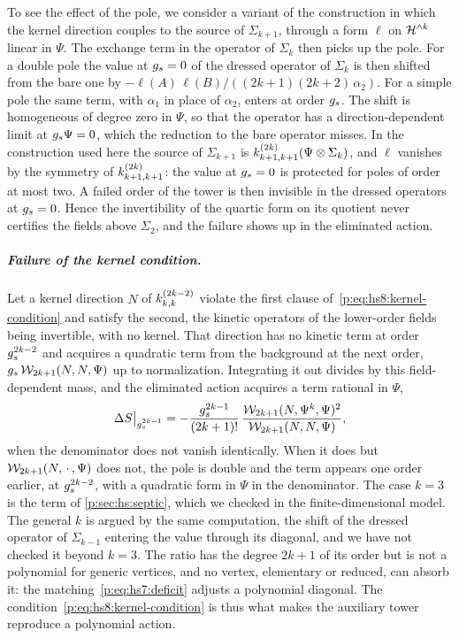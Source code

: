 To see the effect of the pole, we consider a variant of the construction in which the kernel direction couples to the source of $\Sigma_{k + 1}$, through a form $\ell$ on $\mathcal{H}^{\wedge k}$ linear in $\Psi$.
The exchange term in the operator of $\Sigma_k$ then picks up the pole.
For a double pole the value at $g_s = 0$ of the dressed operator of $\Sigma_k$ is then shifted from the bare one by $- \ell(A) \, \ell(B) / ((2 k + 1) (2 k + 2) \, \alpha_2)$.
For a simple pole the same term, with $\alpha_1$ in place of $\alpha_2$, enters at order $g_s$.
The shift is homogeneous of degree zero in $\Psi$, so that the operator has a direction-dependent limit at $g_s \Psi = 0$, which the reduction to the bare operator misses.
In the construction used here the source of $\Sigma_{k + 1}$ is $\kin{k + 1}{}{2 k}(\Psi \otimes \Sigma_k)$, and $\ell$ vanishes by the symmetry of $\kin{k + 1}{}{2 k}$: the value at $g_s = 0$ is protected for poles of order at most two.
A failed order of the tower is then invisible in the dressed operators at $g_s = 0$.
Hence the invertibility of the quartic form on its quotient never certifies the fields above $\Sigma_2$, and the failure shows up in the eliminated action.

\subparagraph{Failure of the kernel condition.}

Let a kernel direction $N$ of $\kin{k}{}{2 k - 2}$ violate the first clause of~\eqref{p:eq:hs8:kernel-condition} and satisfy the second, the kinetic operators of the lower-order fields being invertible, with no kernel.
That direction has no kinetic term at order $g_s^{2 k - 2}$ and acquires a quadratic term from the background at the next order, $g_s \, \mathcal{W}_{2 k + 1}(N, N, \Psi)$ up to normalization.
Integrating it out divides by this field-dependent mass, and the eliminated action acquires a term rational in $\Psi$,
\begin{equation}
  \label{p:eq:hs8:rational}
  \Delta S \big|_{g_s^{2 k - 1}}
    = - \frac{g_s^{2 k - 1}}{(2 k + 1)!} \, \frac{\mathcal{W}_{2 k + 1}(N, \Psi^k, \Psi)^2}{\mathcal{W}_{2 k + 1}(N, N, \Psi)},
\end{equation}
when the denominator does not vanish identically.
When it does but $\mathcal{W}_{2 k + 1}(N, \, \cdot \,, \Psi)$ does not, the pole is double and the term appears one order earlier, at $g_s^{2 k - 2}$, with a quadratic form in $\Psi$ in the denominator.
The case $k = 3$ is the term of \cref{p:sec:hs:septic}, which we checked in the finite-dimensional model.
The general $k$ is argued by the same computation, the shift of the dressed operator of $\Sigma_{k - 1}$ entering the value through its diagonal, and we have not checked it beyond $k = 3$.
The ratio has the degree $2 k + 1$ of its order but is not a polynomial for generic vertices, and no vertex, elementary or reduced, can absorb it: the matching~\eqref{p:eq:hs7:deficit} adjusts a polynomial diagonal.
The condition~\eqref{p:eq:hs8:kernel-condition} is thus what makes the auxiliary tower reproduce a polynomial action.

